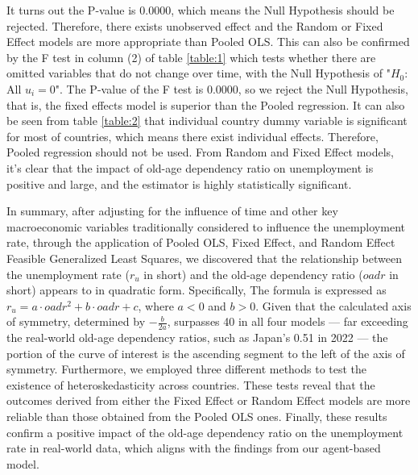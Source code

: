 \documentclass[ %
    final,
    scrbook,
    listoffigures,
    listoftables, 
    glossary]{cu-thesis}
\begin{document}
\iffalse
Assumption: Normal error terms
Variables: All independent variables

H0: Constant variance

   chi2(39) = 1053.65
Prob > chi2 =  0.0000
\fi



It turns out the P-value is 0.0000, which means the Null Hypothesis should be rejected. Therefore, there exists unobserved effect and the Random or Fixed Effect models are more appropriate than Pooled OLS. This can also be confirmed by the F test in column (2) of table \ref{table:1} which tests whether there are omitted variables that do not change over time, with the Null Hypothesis of "$H_0$: All $u_i=0$". The P-value of the F test is 0.0000, so we reject the Null Hypothesis, that is, the fixed effects model is superior than the Pooled regression. It can also be seen from table \ref{table:2} that individual country dummy variable is significant for most of countries, which means there exist individual effects. Therefore, Pooled regression should not be used. From Random and Fixed Effect models, it's clear that the impact of old-age dependency ratio on unemployment is positive and large, and the estimator is highly statistically significant.

In summary, after adjusting for the influence of time and other key macroeconomic variables traditionally considered to influence the unemployment rate, through the application of Pooled OLS, Fixed Effect, and Random Effect Feasible Generalized Least Squares, we discovered that the relationship between the unemployment rate ($r_u$ in short) and the old-age dependency ratio ($oadr$ in short) appears to in quadratic form. Specifically, The formula is expressed as 
$r_u = a\cdot oadr^2 + b\cdot oadr + c$, where $a<0$ and $b>0$. Given that the calculated axis of symmetry, determined by $-\frac{b}{2a}$, surpasses 40 in all four models --- far exceeding the real-world old-age dependency ratios, such as Japan's 0.51 in 2022 --- the portion of the curve of interest is the ascending segment to the left of the axis of symmetry. 
Furthermore, we employed three different methods to test the existence of heteroskedasticity across countries. These tests reveal that the outcomes derived from either the Fixed Effect or Random Effect models are more reliable than those obtained from the Pooled OLS ones.
Finally, these results confirm a positive impact of the old-age dependency ratio on the unemployment rate in real-world data, which aligns with the findings from our agent-based model.
\end{document}
